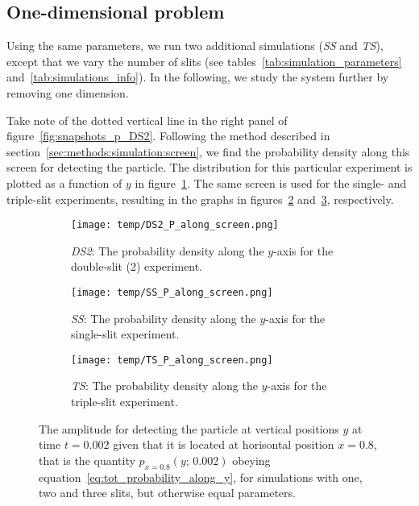 \subsection{One-dimensional problem}

    Using the same parameters, we run two additional simulations (\textit{SS} and \textit{TS}), except that we vary the number of slits (see tables~\ref{tab:simulation_parameters} and~\ref{tab:simulations_info}). In the following, we study the system further by removing one dimension.

    Take note of the dotted vertical line in the right panel of figure~\ref{fig:snapshots_p_DS2}. Following the method described in section~\ref{sec:methods:simulation:screen}, we find the probability density along this screen for detecting the particle.  The distribution for this particular experiment is plotted as a function of $y$ in figure~\ref{fig:p_along_y_DS2}. The same screen is used for the single- and triple-slit experiments, resulting in the graphs in figures~\ref{fig:p_along_y_SS} and~\ref{fig:p_along_y_TS}, respectively. %

    \begin{figure}
        \centering
        \begin{subfigure}{0.46\textwidth}
            \texttt{[image: temp/DS2\_P\_along\_screen.png]}
            \caption{\textit{DS2}: The probability density along the $y$-axis for the double-slit (2) experiment.}
            \label{fig:p_along_y_DS2}
        \end{subfigure}
        \hfill
        \begin{subfigure}{0.46\textwidth}
            \texttt{[image: temp/SS\_P\_along\_screen.png]}
            \caption{\textit{SS}: The probability density along the $y$-axis for the single-slit experiment.}
            \label{fig:p_along_y_SS}
        \end{subfigure}
        \hfill
        \begin{subfigure}{0.46\textwidth}
            \texttt{[image: temp/TS\_P\_along\_screen.png]}
            \caption{\textit{TS}: The probability density along the $y$-axis for the triple-slit experiment.}
            \label{fig:p_along_y_TS}
        \end{subfigure}
        \caption{The amplitude for detecting the particle at vertical positions $y$ at time $t=0.002$ given that it is located at horisontal position $x=0.8$, that is the quantity $p_{x=0.8}(y;\, 0.002)$ obeying equation~\eqref{eq:tot_probability_along_y}, for simulations with one, two and three slits, but otherwise equal parameters.}
        \label{fig:p_along_y}
    \end{figure}






